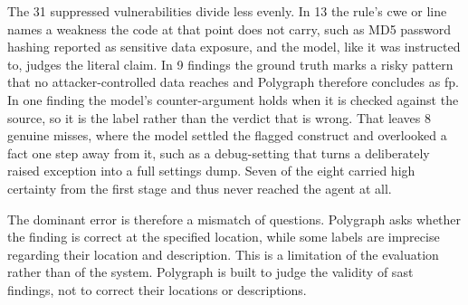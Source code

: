 The 31 suppressed vulnerabilities divide less evenly. In 13 the rule's \ac{cwe} or
line names a weakness the code at that point does not carry, such as MD5
password hashing reported as sensitive data exposure, and the model, like it was instructed to, judges the literal claim.
In 9 findings the ground truth marks a risky pattern that no attacker-controlled data reaches and Polygraph therefore concludes as \ac{fp}.
In one finding the model's counter-argument holds when it is checked against the source, so it is the label rather than the verdict that is wrong.
That leaves 8 genuine misses, where the model settled the flagged construct and overlooked a fact one step away from it, such as a debug-setting that turns a deliberately raised exception into a full settings dump. Seven of the eight carried high certainty from the first stage and thus never reached the agent at all.

The dominant error is therefore a mismatch of questions. Polygraph asks whether the finding is correct at the specified location, while some labels are imprecise regarding their location and description. This is a limitation of the evaluation rather than of the system. Polygraph is built to judge the validity of \ac{sast} findings, not to correct their locations or descriptions.
